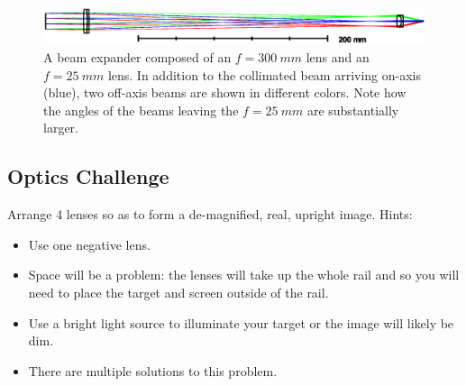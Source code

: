 \documentclass[a4paper]{report}
\begin{document}
\begin{figure}[h]
\center
\includegraphics[width=6in]{Telescope.eps}
\caption{A beam expander composed of an $f=300~mm$ lens and an $f=25~mm$ lens. 
In addition to the collimated beam arriving on-axis (blue), two off-axis beams are shown in different colors.
Note how the angles of the beams leaving the $f=25~mm$ are substantially larger.}
\label{fig:telescope}
\end{figure}

\clearpage


\subsection{Optics Challenge}
Arrange 4 lenses so as to form a de-magnified, real, upright image. Hints: 
\begin{itemize}
\item Use one negative lens.
\item Space will be a problem: the lenses will take up the whole rail and so you will need to place the target and screen outside of the rail.
\item Use a bright light source to illuminate your target or the image will likely be dim. 
\item There are multiple solutions to this problem.
\end{itemize}

\vspace{8em}
\end{document}
